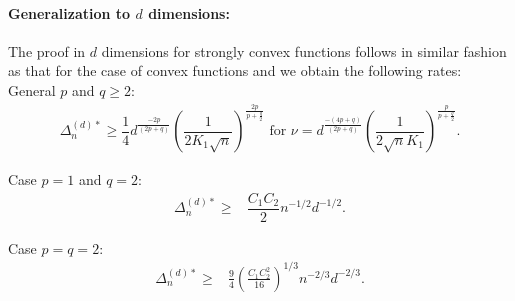
\paragraph{Generalization to $d$ dimensions:}
The proof in $d$ dimensions for strongly convex functions follows in similar fashion as that for the case of convex functions and we obtain the following rates:
General $p$ and $q\ge 2$:
\begin{align}
\Delta_n^{(d)*} \ge \dfrac{1}{4} d^{\frac{-2p}{(2p+q)}} \left(\dfrac{1}{2 K_1 \sqrt n}\right)^{\frac{2p}{p+\frac{q}{2}}} \text{ for } 
\nu = d^{\frac{-(4p+q)}{(2p+q)}}\left(\dfrac{1}{2\sqrt{n} K_1} \right)^{\frac{p}{p+\frac{q}{2}}}.
\label{eq:lb-pq-d}
\end{align}

Case $p=1$ and $q=2$:
\begin{align*}
\Delta_n^{(d)*}  \ge& \dfrac{C_1 C_2}{2} n^{-1/2} d^{-1/2}.
\end{align*}

Case $p=q=2$:
\begin{align*}
\Delta_n^{(d)*}  \ge& \frac{9}{4}\left(\frac{C_1 C_2^2}{16}\right)^{1/3} n^{-2/3} d^{-2/3}.
\end{align*}

